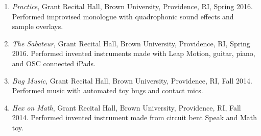 \begin{enumerate}
 \item \emph{Practice}, Grant Recital Hall, Brown University, Providence, RI, Spring 2016. \subitem Performed improvised monologue with quadrophonic sound effects and sample overlays.\\
 \item \emph{The Sabateur}, Grant Recital Hall, Brown University, Providence, RI, Spring 2016. \subitem Performed invented instruments made with Leap Motion, guitar, piano, and OSC connected iPads.\\
 \item \emph{Bug Music}, Grant Recital Hall, Brown University, Providence, RI, Fall 2014. \subitem Performed music with automated toy bugs and contact mics.\\
 \item \emph{Hex on Math}, Grant Recital Hall, Brown University, Providence, RI, \hfill Fall 2014. \subitem Performed invented instrument made from circuit bent Speak and Math toy. \\

\end{enumerate}